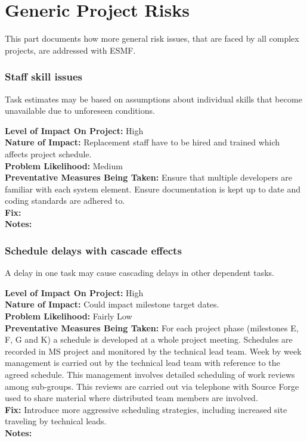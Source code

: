 \documentclass[english]{article}
\newcommand{\req}[1]{\section{\hspace{.2in}#1}}
\newenvironment
{reqlist}
{\begin{list} {} {} \rm \item[]}
{\end{list}}
\begin{document}
\newpage
\part{Generic Project Risks}

This part documents how more general risk issues, that are faced by all complex projects,
are addressed with ESMF.

\req{Staff skill issues}
Task estimates may be based on assumptions about individual skills that become unavailable
due to unforeseen conditions.
\begin{reqlist}
{\bf Level of Impact On Project:} High \\
{\bf Nature of Impact:} Replacement staff have to be hired and trained which affects
project schedule.\\
{\bf Problem Likelihood:} Medium \\
{\bf Preventative Measures Being Taken:} Ensure that multiple developers are familiar
with each system element. Ensure documentation is kept up to date and coding
standards are adhered to.\\
{\bf Fix:} \\
{\bf Notes:} 
\end{reqlist}

\req{Schedule delays with cascade effects}
A delay in one task may cause cascading delays in other dependent tasks.
\begin{reqlist}
{\bf Level of Impact On Project:} High \\
{\bf Nature of Impact:} Could impact milestone target dates.\\
{\bf Problem Likelihood:} Fairly Low \\
{\bf Preventative Measures Being Taken:} For each project phase
(milestones E, F, G and K) a schedule is developed at a whole project meeting. 
Schedules are recorded in MS project and monitored by the technical lead team.
Week by week management is carried out by the technical lead team with reference to the
agreed schedule. This management involves detailed scheduling of
work reviews among sub-groups. This reviews are carried out via telephone
with Source Forge used to share material where distributed team members are
involved.  \\
{\bf Fix:} Introduce more aggressive scheduling strategies, including
increased site traveling by technical leads.\\
{\bf Notes:} 
\end{reqlist}
\end{document}
